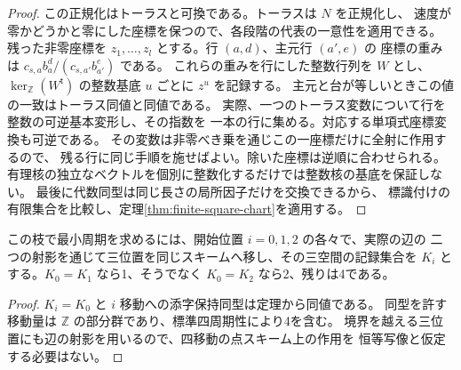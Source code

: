 \begin{proof}
この正規化はトーラスと可換である。トーラスは $N$ を正規化し、
速度が零かどうかと零にした座標を保つので、各段階の代表の一意性を適用できる。
残った非零座標を $z_1,\ldots,z_l$ とする。行 $(a,d)$、主元行 $(a',e)$ の
座標の重みは $c_{s,a}b_a^d/(c_{s,a'}b_{a'}^e)$ である。
これらの重みを行にした整数行列を $W$ とし、
$\ker_{\mathbb Z}(W^{\mathsf t})$ の整数基底 $u$ ごとに $z^u$ を記録する。
主元と台が等しいときこの値の一致はトーラス同値と同値である。
実際、一つのトーラス変数について行を整数の可逆基本変形し、その指数を
一本の行に集める。対応する単項式座標変換も可逆である。
その変数は非零べき乗を通じこの一座標だけに全射に作用するので、
残る行に同じ手順を施せばよい。除いた座標は逆順に合わせられる。
有理核の独立なベクトルを個別に整数化するだけでは整数核の基底を保証しない。
最後に代数同型は同じ長さの局所因子だけを交換できるから、
標識付けの有限集合を比較し、定理\ref{thm:finite-square-chart}を適用する。
\end{proof}

\begin{corollary}\label{cor:curvilinear-window-period}
この枝で最小周期を求めるには、開始位置 $i=0,1,2$ の各々で、実際の辺の
二つの射影を通じて三位置を同じスキームへ移し、その三空間の記録集合を
$K_i$ とする。$K_0=K_1$ なら1、そうでなく $K_0=K_2$ なら2、残りは4である。
\end{corollary}
\begin{proof}
$K_i=K_0$ と $i$ 移動への添字保持同型は定理から同値である。
同型を許す移動量は $\mathbb Z$ の部分群であり、標準四周期性により4を含む。
境界を越える三位置にも辺の射影を用いるので、四移動の点スキーム上の作用を
恒等写像と仮定する必要はない。
\end{proof}

